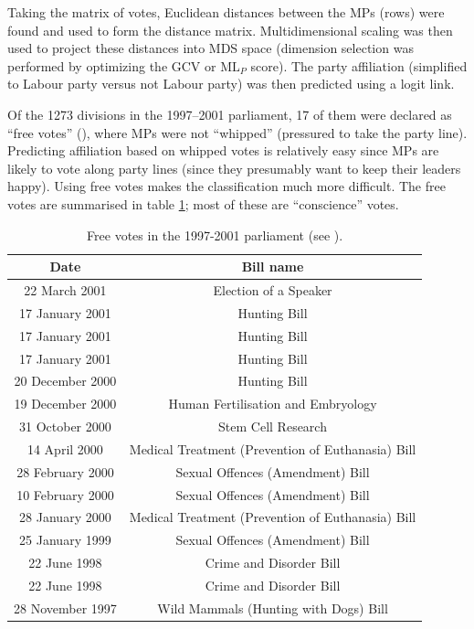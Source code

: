 Taking the matrix of votes, Euclidean distances between the MPs (rows) were found and used to form the distance matrix. Multidimensional scaling was then used to project these distances into MDS space (dimension selection was performed by optimizing the GCV or $\text{ML}_P$ score). The party affiliation (simplified to Labour party versus not Labour party) was then predicted using a logit link.

Of the 1273 divisions in the 1997--2001 parliament, 17 of them were declared  as ``free votes'' (\cite{freevotes}), where MPs were not ``whipped'' (pressured to take the party line). Predicting affiliation based on whipped votes is relatively easy since MPs are likely to vote along party lines (since they presumably want to keep their leaders happy). Using free votes makes the classification much more difficult. The free votes are summarised in table \ref{free-vote-description}; most of these are ``conscience'' votes.

\begin{table}  
\begin{centering}
\begin{tabular}{cc}
	Date & Bill name \\
    \hline
    \hline
22 March 2001    &   Election of a Speaker \\
17 January 2001  &   Hunting Bill \\
17 January 2001  &   Hunting Bill \\
17 January 2001  &   Hunting Bill\\
20 December 2000 &   Hunting Bill \\
19 December 2000 &   Human Fertilisation and Embryology\\
31 October 2000  &   Stem Cell Research \\
14 April 2000    &   Medical Treatment (Prevention of Euthanasia) Bill \\
28 February 2000 &   Sexual Offences (Amendment) Bill \\
10 February 2000 &   Sexual Offences (Amendment) Bill \\
28 January 2000  &   Medical Treatment (Prevention of Euthanasia) Bill\\
25 January 1999  &   Sexual Offences (Amendment) Bill\\
22 June 1998     &  Crime and Disorder Bill \\
22 June 1998     &  Crime and Disorder Bill \\
28 November 1997 &  Wild Mammals (Hunting with Dogs) Bill\\
  \end{tabular}
\caption{Free votes in the 1997-2001 parliament (see \cite{freevotes}).}
\end{centering}
\label{free-vote-description}
\end{table}

